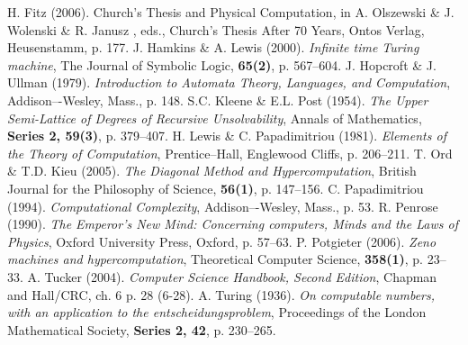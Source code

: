 \documentclass{roffin}
\begin{document}
\begin{thebibliography}{99}

H. Fitz (2006). Church’s Thesis and Physical Computation, in A. Olszewski \& J. Wolenski \& R. Janusz , eds., Church's Thesis After 70 Years, Ontos Verlag, Heusenstamm, p. 177.
J. Hamkins \& A. Lewis (2000). \emph{Infinite time Turing machine}, The Journal of Symbolic Logic, \textbf{65(2)}, p. 567--604.
J. Hopcroft \& J. Ullman (1979). \emph{Introduction to Automata Theory, Languages, and Computation}, Addison–-Wesley, Mass., p. 148.
S.C. Kleene \& E.L. Post (1954). \emph{The Upper Semi-Lattice of Degrees of Recursive Unsolvability}, Annals of Mathematics, \textbf{Series 2, 59(3)}, p. 379--407.
H. Lewis \& C. Papadimitriou (1981). \emph{Elements of the Theory of Computation}, Prentice--Hall, Englewood Cliffs, p. 206--211.
T. Ord \& T.D. Kieu (2005). \emph{The Diagonal Method and Hypercomputation}, British Journal for the Philosophy of Science, \textbf{56(1)}, p. 147--156.
C. Papadimitriou (1994). \emph{Computational Complexity}, Addison–-Wesley, Mass., p. 53.
R. Penrose (1990). \emph{The Emperor's New Mind: Concerning computers, Minds and the Laws of Physics}, Oxford University Press, Oxford, p. 57--63.
P. Potgieter (2006). \emph{Zeno machines and hypercomputation}, Theoretical Computer Science, \textbf{358(1)}, p. 23--33.  
A. Tucker (2004). \emph{Computer Science Handbook, Second Edition}, Chapman and Hall/CRC, ch. 6 p. 28 (6-28).
A. Turing (1936). \emph{On computable numbers, with an application to the entscheidungsproblem}, Proceedings of the London Mathematical Society, \textbf{Series 2, 42}, p. 230--265.

\end{thebibliography}
\end{document}
